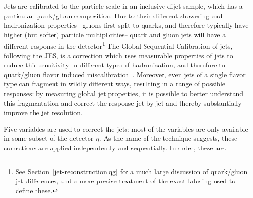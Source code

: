 Jets are calibrated to the particle scale in an inclusive dijet sample, which has a particular quark/gluon composition. Due to their different showering and hadronization properties-- gluons first split to quarks, and therefore typically have higher (but softer) particle multiplicities-- quark and gluon jets will have a different response in the detector\footnote{See Section~\ref{jet-reconstruction:qg} for a much large discussion of quark/gluon jet differences, and a more precise treatment of the exact labeling used to define these.} The Global Sequential Calibration of jets, following the JES, is a correction which uses measurable properties of jets to reduce this sensitivity to different types of hadronization, and therefore to quark/gluon flavor induced miscalibration~\cite{ATLAS-GSC}. Moreover, even jets of a single flavor type can fragment in wildly different ways, resulting in a range of possible responses: by measuring global jet properties, it is possible to better understand this fragmentation and correct the response jet-by-jet and thereby substantially improve the jet resolution.

Five variables are used to correct the jets; most of the variables are only available in some subset of the detector $\eta$. As the name of the technique suggests, these corrections are applied independently and sequentially. In order, these are:

